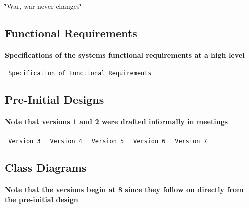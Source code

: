 \char`\"{}\+War, war never changes\char`\"{}

\subsection*{Functional Requirements}

\paragraph*{Specifications of the system\textquotesingle{}s functional requirements at a high level}

\href{https://docs.google.com/document/d/1FI2bZ3nHOD-c8ti6TUO3enkvk95sN-nQmOg7ApcTxNY/edit?usp=share_link}{\texttt{ Specification of Functional Requirements}}

\subsection*{Pre-\/\+Initial Designs}

\paragraph*{Note that versions 1 and 2 were drafted informally in meetings}

\href{https://drive.google.com/file/d/1X7BIpcM84tJI-jKWnbUa4yTkxvy6Kxrb/view?usp=share_link}{\texttt{ Version 3}}~\newline
 \href{https://drive.google.com/file/d/1zypmBTo7UJJKXWHUjyhIJOqPuVEyR1A6/view?usp=share_link}{\texttt{ Version 4}}~\newline
 \href{https://drive.google.com/file/d/1kJ8KX5Du98V_uNOdFYTlgRAb3cTTT70l/view?usp=share_link}{\texttt{ Version 5}}~\newline
 \href{https://drive.google.com/file/d/1KiVPlr2pf9UIaaFpgy3qCFdS0gLlSAq9/view?usp=share_link}{\texttt{ Version 6}}~\newline
 \href{https://drive.google.com/file/d/1MvZ0nuDfLJ7AOLk1EIC1n25Ki_BF00Jd/view?usp=share_link}{\texttt{ Version 7}}~\newline


\subsection*{Class Diagrams}

\paragraph*{Note that the versions begin at 8 since they follow on directly from the pre-\/initial design}

